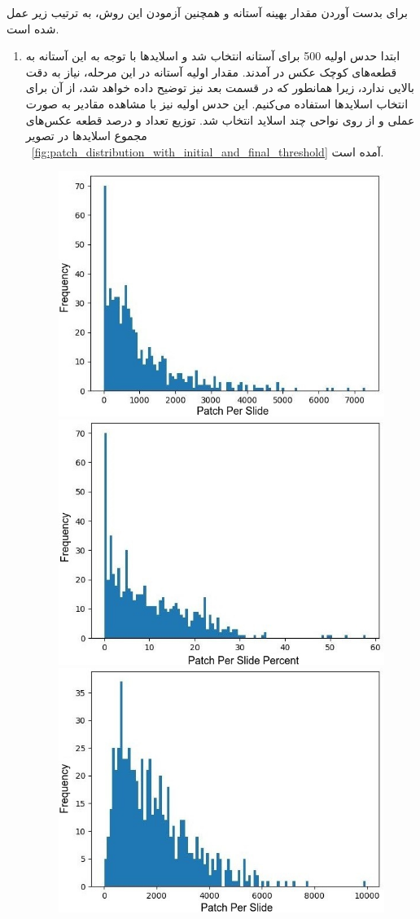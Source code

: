 برای بدست آوردن مقدار بهینه آستانه و همچنین آزمودن این روش، به ترتیب زیر عمل شده است.
\begin{enumerate}
    \item ابتدا حدس اولیه 500 برای آستانه انتخاب شد و اسلاید‌ها با توجه به این آستانه به قطعه‌های کوچک عکس در آمدند.
    مقدار اولیه آستانه در این مرحله، نیاز به دقت بالایی ندارد، زیرا همانطور که در قسمت بعد نیز توضیح داده خواهد شد، از آن برای انتخاب اسلاید‌ها استفاده می‌کنیم.
    این حدس اولیه نیز با مشاهده مقادیر به صورت عملی و از روی نواحی چند اسلاید انتخاب شد.
    توزیع تعداد و درصد قطعه عکس‌های مجموع اسلایدها در تصویر ~\ref{fig:patch_distribution_with_initial_and_final_threshold} آمده است.
    \begin{figure}
        \begin{center}
            \includegraphics[width=0.48\linewidth]{figs/introduction/subs/challenges/patch_distribution_old_500_threshold_new_new.jpeg}
            \includegraphics[width=0.48\linewidth]{figs/introduction/subs/challenges/patch_percent_distribution_old_threshold_500_new_new.jpeg}
            \hspace{.2cm}
            \includegraphics[width=0.48\linewidth]{figs/introduction/subs/challenges/patch_distribution_new_298_threshold_new_new.jpeg}

\end{center}
\end{figure}
\end{enumerate}
